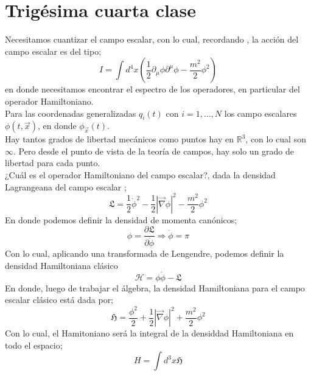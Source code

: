 \documentclass[../main.tex]{subfiles}
\begin{document}
\section{Trigésima cuarta clase}
Necesitamos cuantizar el campo escalar, con lo cual, recordando , la acción del campo escalar es del tipo;
\begin{equation}
   I = \int d^4x \left( \frac{1}{2}\partial_\mu \phi \partial^\mu \phi - \frac{m^2}{2}\phi^2 \right)
 \end{equation}
en donde necesitamos encontrar el espectro de los operadores, en particular del operador Hamiltoniano.
\\
Para las coordenadas generalizadas $q_i(t)$ con $i=1,\dots, N$ los campo escalares $\phi(t,\vec{x})$, en donde $\phi_{\vec{x}}(t)$. \\
Hay tantos grados de libertad mecánicos como puntos hay en $\mathbb{R}^3$, con lo cual son $\infty$. Pero desde el punto de vista de la teoría de campos, hay solo un grado de libertad para cada punto.
\\
¿Cuál es el operador Hamiltoniano del campo escalar?, dada la densidad Lagrangeana del campo escalar ;
\begin{equation}
  \mathfrak{L} = \frac{1}{2}\dot{\phi}^2 - \frac{1}{2} |\vec{\nabla}\phi|^2 - \frac{m^2}{2}\phi^2
 \end{equation}
 En donde podemos definir la densidad de momenta canónicos;
 \begin{equation}
   \phi = \frac{\partial \mathfrak{L}}{\partial \dot{\phi}} \Rightarrow \dot{\phi}  =\pi
  \end{equation}
Con lo cual, aplicando una transformada de Lengendre, podemos definir la densidad Hamiltoniana clásico
\begin{equation}
  \mathcal{H}  =\phi \dot{\phi} - \mathfrak{L}
 \end{equation}
 En donde, luego de trabajar el álgebra, la densidad Hamiltoniana para el campo escalar clásico está dada por;
 \begin{equation}
   \mathfrak{H} = \frac{\phi^2}{2}  + \frac{1}{2} |\vec{\nabla}\phi|^2 + \frac{m^2}{2}\phi^2
  \end{equation}
  Con lo cual, el Hamitoniano será la integral de la densiddad Hamiltoniana en todo el espacio;
  \begin{equation}
    H = \int d^3x \mathfrak{H}
   \end{equation}
\end{document}
